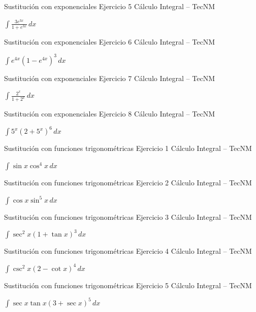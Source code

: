\documentclass[aspectratio=169,12pt]{beamer}
\newcommand{\ejercicio}[1]{%
  \begin{center}
  \vfill
  {\fontsize{24}{30}\selectfont #1}
  \vfill
  \end{center}
}
\begin{document}
\begin{frame}{Sustitución con exponenciales}
\small Ejercicio 5 \hfill Cálculo Integral -- TecNM
\ejercicio{$\displaystyle \int\frac{3e^{3x}}{1+e^{3x}}\,dx$}
\end{frame}

\begin{frame}{Sustitución con exponenciales}
\small Ejercicio 6 \hfill Cálculo Integral -- TecNM
\ejercicio{$\displaystyle \int e^{4x}(1-e^{4x})^3\,dx$}
\end{frame}

\begin{frame}{Sustitución con exponenciales}
\small Ejercicio 7 \hfill Cálculo Integral -- TecNM
\ejercicio{$\displaystyle \int\frac{2^x}{1+2^x}\,dx$}
\end{frame}

\begin{frame}{Sustitución con exponenciales}
\small Ejercicio 8 \hfill Cálculo Integral -- TecNM
\ejercicio{$\displaystyle \int 5^x(2+5^x)^6\,dx$}
\end{frame}

\begin{frame}{Sustitución con funciones trigonométricas}
\small Ejercicio 1 \hfill Cálculo Integral -- TecNM
\ejercicio{$\displaystyle \int\sin x\cos^4x\,dx$}
\end{frame}

\begin{frame}{Sustitución con funciones trigonométricas}
\small Ejercicio 2 \hfill Cálculo Integral -- TecNM
\ejercicio{$\displaystyle \int\cos x\sin^5x\,dx$}
\end{frame}

\begin{frame}{Sustitución con funciones trigonométricas}
\small Ejercicio 3 \hfill Cálculo Integral -- TecNM
\ejercicio{$\displaystyle \int\sec^2x(1+\tan x)^3\,dx$}
\end{frame}

\begin{frame}{Sustitución con funciones trigonométricas}
\small Ejercicio 4 \hfill Cálculo Integral -- TecNM
\ejercicio{$\displaystyle \int\csc^2x(2-\cot x)^4\,dx$}
\end{frame}

\begin{frame}{Sustitución con funciones trigonométricas}
\small Ejercicio 5 \hfill Cálculo Integral -- TecNM
\ejercicio{$\displaystyle \int\sec x\tan x(3+\sec x)^5\,dx$}
\end{frame}
\end{document}
